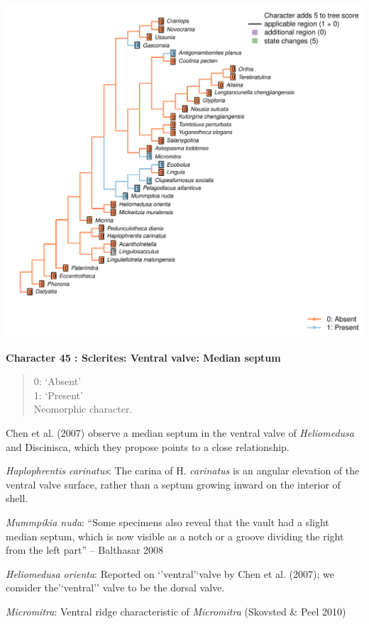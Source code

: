 \documentclass[]{book}
\theoremstyle{definition}
\theoremstyle{definition}
\theoremstyle{definition}
\theoremstyle{remark}
\begin{document}
\includegraphics{Brachiopod_phylogeny_files/figure-latex/unnamed-chunk-5-45.pdf}

\textbf{Character 45 : Sclerites: Ventral valve: Median septum }

\begin{quote}
0: `Absent'\\
1: `Present'\\
Neomorphic character.
\end{quote}

Chen et al. (2007) observe a median septum in the ventral valve of
\emph{Heliomedusa} and Discinisca, which they propose points to a close
relationship.

\emph{Haplophrentis carinatus}: The carina of H. \emph{carinatus} is an
angular elevation of the ventral valve surface, rather than a septum
growing inward on the interior of shell.

\emph{Mummpikia nuda}: ``Some specimens also reveal that the vault had a
slight median septum, which is now visible as a notch or a groove
dividing the right from the left part'' -- Balthasar 2008

\emph{Heliomedusa orienta}: Reported on `'ventral'`valve by Chen et al.
(2007); we consider the'`ventral'' valve to be the dorsal valve.

\emph{Micromitra}: Ventral ridge characteristic of \emph{Micromitra}
(Skovsted \& Peel 2010)
\end{document}

